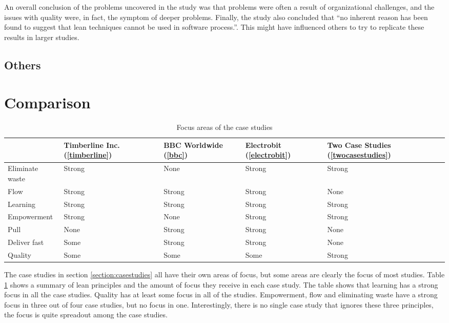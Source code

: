 An overall conclusion of the problems uncovered in the study was that problems were often a result of organizational challenges, and the issues with quality were, in fact, the symptom of deeper problems. Finally, the study also concluded that ``no inherent reason has been found to suggest that lean techniques cannot be used in software process.''\cite{Middleton2001Lean}. This might have influenced others to try to replicate these results in larger studies.



\subsection{Others}
\label{othercases}


\section{Comparison}
\label{section:comparison}

\begin{table}
  \begin{tabular}{ | l | p{65pt} | p{65pt} | p{65pt} | p{65pt} |}
    \hline
      & Timberline Inc. (\ref{timberline}) & BBC Worldwide (\ref{bbc}) & Electrobit (\ref{electrobit}) & Two Case Studies (\ref{twocasestudies}) \\
    \hline
    Eliminate waste & Strong & None   & Strong & Strong \\
    \hline
    Flow            & Strong & Strong & Strong & None \\
    \hline
    Learning        & Strong & Strong & Strong & Strong \\
    \hline
    Empowerment     & Strong & None   & Strong & Strong \\
    \hline
    Pull            & None   & Strong & Strong & None \\
    \hline
    Deliver fast    & Some   & Strong & Strong & None \\
    \hline
    Quality         & Some   & Some   & Some   & Strong \\
    \hline
  \end{tabular}
  \caption{Focus areas of the case studies}
  \label{tbl:practices}
\end{table}

The case studies in section \ref{section:casestudies} all have their own areas of focus, but some areas are clearly the focus of most studies. Table \ref{tbl:practices} shows a summary of lean principles and the amount of focus they receive in each case study. The table shows that learning has a strong focus in all the case studies. Quality has at least some focus in all of the studies. Empowerment, flow and eliminating waste have a strong focus in three out of four case studies, but no focus in one. Interestingly, there is no single case study that ignores these three principles, the focus is quite spreadout among the case studies.

